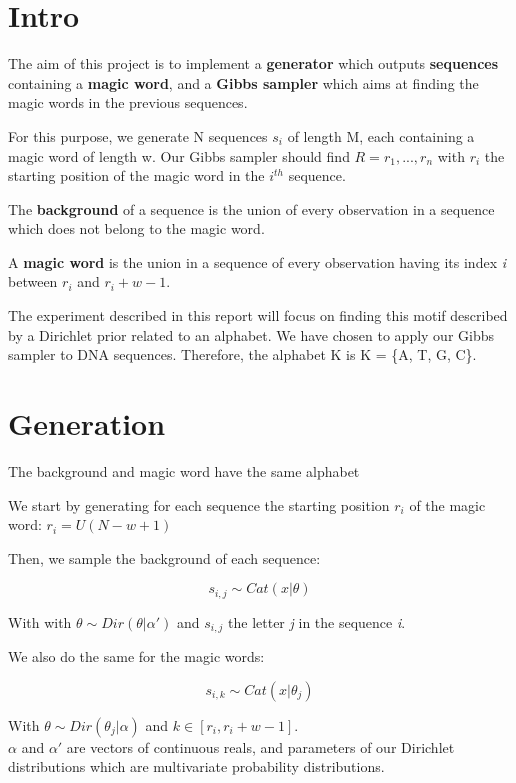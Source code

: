 \section{Intro}
The aim of this project is to implement a \textbf{generator} which outputs \textbf{sequences} containing a \textbf{magic word}, and a \textbf{Gibbs sampler} which aims at finding the magic words in the previous sequences.

For this purpose, we generate N sequences $s_i$ of length M, each containing a magic word of length w. Our Gibbs sampler should find $R = {r_1,...,r_n}$ with $r_i$ the starting position of the magic word in the $i^{th}$ sequence.

The \textbf{background} of a sequence is the union of every observation in a sequence which does not belong to the magic word.

A \textbf{magic word} is the union in a sequence of every observation having its index \textit{i} between $r_i$ and $r_i + w - 1$.

The experiment described in this report will focus on finding this motif described by a Dirichlet prior related to an alphabet. We have chosen to apply our Gibbs sampler to DNA sequences. Therefore, the alphabet K is K = \{A, T, G, C\}.

\section{Generation}
The background and magic word have the same alphabet

We start by generating for each sequence the starting position $r_i$ of the magic word: $r_i = U(N-w+1)$


Then, we sample the background of each sequence:

\begin{equation}
s_{i,j} \sim Cat(x|\theta)
\end{equation}

With with $\theta \sim Dir(\theta|\alpha')$ and $s_{i,j}$ the letter \textit{j} in the sequence \textit{i}.


We also do the same for the magic words:

\begin{equation}
s_{i,k} \sim Cat(x|\theta_j)
\end{equation}

With $\theta \sim Dir(\theta_j|\alpha)$ and $k \in [r_i, r_i+w-1]$.
\\

$\alpha$ and $\alpha'$ are vectors of continuous reals, and parameters of our Dirichlet distributions which are multivariate probability distributions.

